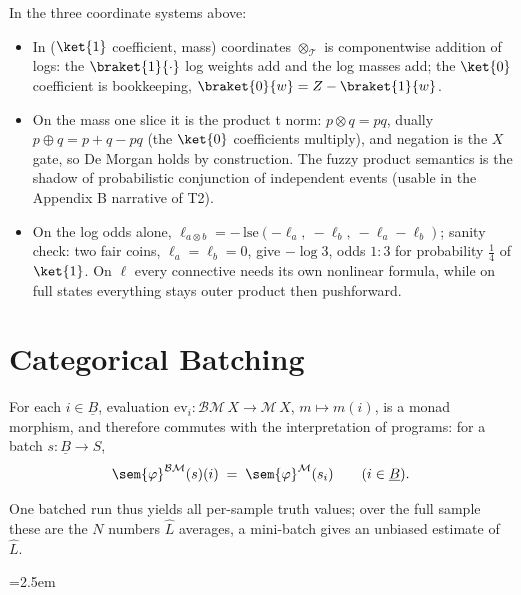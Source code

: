 \documentclass[anon]{../../journal-templates/NeSy26/nesy2026} %
\begin{document}
In the three coordinate systems above:
\begin{itemize}
\item In ($\ket{1}$ coefficient, mass) coordinates
  $\otimes_{\mathcal T}$ is componentwise addition of logs: the
  $\braket{1}{{\cdot}}$ log weights add and the log masses add; the
  $\ket{0}$ coefficient is bookkeeping,
  $\braket{0}{w} = Z - \braket{1}{w}$.
\item On the mass one slice it is the product t norm:
  $p \otimes q = pq$, dually $p \oplus q = p + q - pq$ (the $\ket{0}$
  coefficients multiply), and negation is the $X$ gate, so De Morgan
  holds by construction. The fuzzy product semantics is the shadow of
  probabilistic conjunction of independent events (usable in the
  Appendix B narrative of T2).
\item On the log odds alone,
  $\ell_{a \otimes b} = -\,\mathrm{lse}(-\ell_a,\ -\ell_b,\
  -\ell_a - \ell_b)$; sanity check: two fair coins, $\ell_a = \ell_b = 0$,
  give $-\log 3$, odds $1{:}3$ for probability $\tfrac14$ of $\ket{1}$.
  On $\ell$ every connective needs its own nonlinear formula, while on
  full states everything stays outer product then pushforward.
\end{itemize}

\section{Categorical Batching}

\begin{proposition}
  \label{prop:pointwise}
  For each $i \in \underline B$, evaluation $\mathrm{ev}_i \colon \mathcal B\mathcal M\,X \to
  \mathcal M\,X$, $m \mapsto m(i)$, is a monad morphism, and therefore commutes with the
  interpretation of \doNotation programs: for a batch $s \colon \underline B \to S$,
  \[
    \sem{\varphi}^{\mathcal B\mathcal M}(s)(i) \;=\; \sem{\varphi}^{\mathcal M}(s_i)
    \qquad (i \in \underline B).
  \]
  \end{proposition}
  
  \noindent
  One batched run thus yields all per-sample truth values; over the full
  sample these are the $N$ numbers $\widehat L$ averages, a mini-batch gives an unbiased
  estimate of $\widehat L$.

\newpage
\begingroup
\emergencystretch=2.5em
\providecommand{\qed}{\hfill$\square$}
\end{document}

